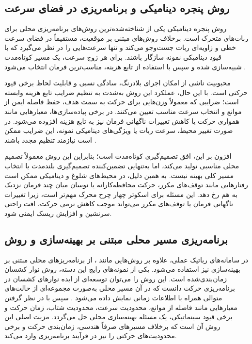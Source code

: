 \subsection{روش پنجره دینامیکی و برنامه‌ریزی در فضای سرعت}

روش پنجره دینامیکی%
یکی از شناخته‌شده‌ترین روش‌های برنامه‌ریزی محلی برای ربات‌های متحرک است. برخلاف روش‌های مبتنی بر موقعیت،  مستقیماً در فضای سرعت خطی و زاویه‌ای ربات جست‌وجو می‌کند و تنها سرعت‌هایی را در نظر می‌گیرد که با قیود دینامیکی نمونه سازگار باشند. برای هر زوج سرعت، یک مسیر کوتاه‌مدت شبیه‌سازی شده و سپس با استفاده از تابع هزینه، مناسب‌ترین فرمان انتخاب می‌شود %
\cite{fox1997dwa}.

محبوبیت  ناشی از امکان اجرای بلادرنگ، سادگی نسبی و قابلیت لحاظ برخی قیود حرکتی است. با این حال، عملکرد این روش به‌شدت به تنظیم ضرایب تابع هزینه وابسته است؛ ضرایبی که معمولاً وزن‌هایی برای حرکت به سمت هدف، حفظ فاصله ایمن از موانع و انتخاب سرعت مناسب تعیین می‌کنند. در برخی پیاده‌سازی‌ها، معیارهایی مانند همواری حرکت یا کاهش تغییرات ناگهانی فرمان نیز به تابع هزینه افزوده می‌شود. در صورت تغییر محیط، سرعت ربات یا ویژگی‌های دینامیکی نمونه، این ضرایب ممکن است نیازمند تنظیم مجدد باشند %
\cite{LaValle2006Planning,Choset2005Principles, fox1997dwa}.

افزون بر این، افق تصمیم‌گیری  کوتاه‌مدت است؛ بنابراین این روش معمولاً تصمیم محلی مناسبی تولید می‌کند، اما به‌تنهایی تضمین‌کننده تصمیم‌گیری بلندمدت یا انتخاب مسیر کلی بهینه نیست. به همین دلیل، در محیط‌های شلوغ و دینامیکی ممکن است رفتارهایی مانند توقف‌های مکرر، حرکت محافظه‌کارانه یا نوسان میان چند فرمان نزدیک به هم رخ دهد. این مسئله برای اسکوتر چهار چرخ محرک مهم‌تر است، زیرا تغییرات ناگهانی فرمان یا توقف‌های مکرر می‌تواند موجب کاهش نرمی حرکت، افت راحتی سرنشین و افزایش ریسک ایمنی شود.

\subsection{برنامه‌ریزی مسیر محلی مبتنی بر بهینه‌سازی و روش }

در سامانه‌های رباتیک عملی، علاوه بر روش‌هایی مانند ، از برنامه‌ریزهای محلی مبتنی بر بهینه‌سازی نیز استفاده می‌شود. یکی از نمونه‌های رایج این دسته، روش نوار کشسان زمان‌بندی‌شده%
است. این روش را می‌توان توسعه‌ای از ایده نوارهای کشسان در برنامه‌ریزی حرکت دانست که در آن مسیر محلی به‌صورت مجموعه‌ای از حالت‌های متوالی همراه با اطلاعات زمانی نمایش داده می‌شود %
\cite{Quinlan1993ElasticBands,Rosmann2013TEB,Rosmann2015TEB}.
سپس با در نظر گرفتن معیارهایی مانند فاصله از موانع، محدودیت سرعت، محدودیت شتاب، زمان حرکت و برخی قیود سینماتیکی، یک مسئله بهینه‌سازی محلی حل می‌گردد. مزیت اصلی این روش آن است که برخلاف مسیرهای صرفاً هندسی، زمان‌بندی حرکت و برخی محدودیت‌های حرکتی را نیز در فرآیند برنامه‌ریزی وارد می‌کند.

